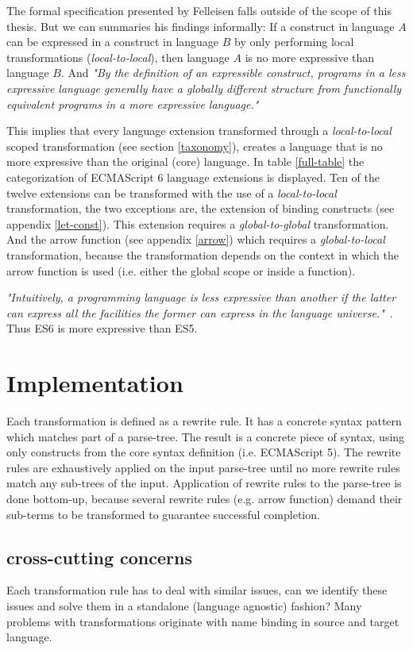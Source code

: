 The formal specification presented by Felleisen falls outside of the scope of this thesis. But we can summaries his findings informally: If a construct in language $A$ can be expressed in a construct in language $B$ by only performing local transformations (\textit{local-to-local}), then language $A$ is no more expressive than language $B$. And \textit{"By the definition of an expressible construct, programs in a less expressive language generally have a globally different structure from functionally equivalent programs in a more expressive language."}\cite{Felleisen1990} 

This implies that every language extension transformed through a \textit{local-to-local} scoped transformation (see section \ref{taxonomy}), creates a language that is no more expressive than the original (core) language. In table \ref{full-table} the categorization of ECMAScript 6 language extensions is displayed. Ten of the twelve extensions can be transformed with the use of a \textit{local-to-local} transformation, the two exceptions are, the extension of binding constructs (see appendix \ref{let-const}). This extension requires a \textit{global-to-global} transformation. And the arrow function (see appendix \ref{arrow}) which requires a \textit{global-to-local} transformation, because the transformation depends on the context in which the arrow function is used (i.e. either the global scope or inside a function).

\textit{"Intuitively, a programming language is less expressive than another if the latter can express all the facilities the former can express in the language universe."}~\cite{Felleisen1990}. Thus ES6 is more expressive than ES5.

\section{Implementation}
Each transformation is defined as a rewrite rule. It has a concrete syntax pattern which matches part of a parse-tree. The result is a concrete piece of syntax, using only constructs from the core syntax definition (i.e. ECMAScript 5).
The rewrite rules are exhaustively applied on the input parse-tree until no more rewrite rules match any sub-trees of the input. Application of rewrite rules to the parse-tree is done bottom-up, because several rewrite rules (e.g. arrow function) demand their sub-terms to be transformed to guarantee successful completion.

\subsection{cross-cutting concerns}
Each transformation rule has to deal with similar issues, can we identify these issues and solve them in a standalone (language agnostic) fashion?
Many problems with transformations originate with name binding in source and target language.

